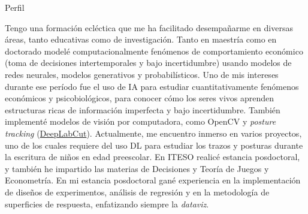 \documentclass{resume} %
\begin{document}
\begin{rSection}{Perfil}
    
    Tengo una formación ecléctica que me ha facilitado desempañarme en diversas áreas, tanto educativas como de investigación. Tanto en maestría como en doctorado modelé computacionalmente fenómenos de comportamiento económico (toma de decisiones intertemporales y bajo incertidumbre) usando modelos de redes neurales, modelos generativos y probabilísticos. Uno de mis intereses durante ese período fue el uso de IA para estudiar cuantitativamente fenómenos económicos y psicobiológicos, para conocer cómo los seres vivos aprenden estructuras ricas de información imperfecta y bajo incertidumbre. También implementé modelos de visión por computadora, como OpenCV y \textit{posture tracking} (\href{http://www.mackenziemathislab.org/deeplabcut}{DeepLabCut}). Actualmente, me encuentro inmerso en varios proyectos, uno de los cuales requiere del uso DL para estudiar los trazos y posturas durante la escritura de niños en edad preescolar. En ITESO realicé estancia posdoctoral, y también he impartido las materias de Decisiones y Teoría de Juegos y Econometría. En mi estancia posdoctoral gané experiencia en la implementación de diseños de experimentos, análisis de regresión y en la metodología de superficies de respuesta, enfatizando siempre la \textit{dataviz}.  %
    
\end{rSection}
\end{document}
